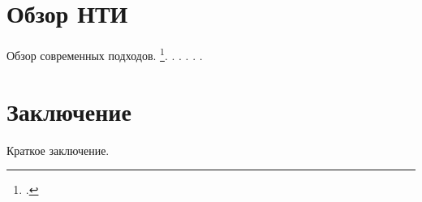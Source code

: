 \documentclass{gostcheck-vkr}
\begin{document}
\section{Обзор НТИ}
Обзор современных подходов.
\footcite{foreign01, foreign02, foreign03, foreign04}.
\cite{foreign05, foreign06, foreign07, foreign08}.
\cite{foreign09, foreign10, foreign11, foreign12}.
\cite{ru01, ru02, ru03, ru04}.
\cite{ru05, ru06, ru07, ru08}.
\cite{online01}.
\section{Заключение}
Краткое заключение.
\end{document}
